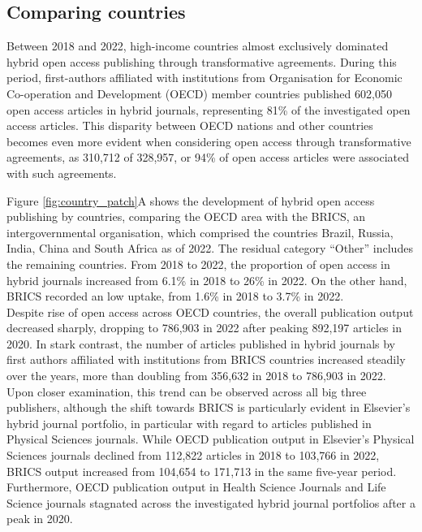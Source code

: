 \documentclass[a4paper,man,floatsintext,longtable,noextraspace,12pt]{apa6}
\begin{document}
\hypertarget{comparing-countries}{%
\subsection{Comparing countries}\label{comparing-countries}}

Between 2018 and 2022, high-income countries almost exclusively
dominated hybrid open access publishing through transformative
agreements. During this period, first-authors affiliated with
institutions from Organisation for Economic Co-operation and Development
(OECD) member countries published 602,050 open access articles in hybrid
journals, representing 81\% of the investigated open access articles.
This disparity between OECD nations and other countries becomes even
more evident when considering open access through transformative
agreements, as 310,712 of 328,957, or 94\% of open access articles were
associated with such agreements.

Figure \ref{fig:country_patch}A shows the development of hybrid open
access publishing by countries, comparing the OECD area with the BRICS,
an intergovernmental organisation, which comprised the countries Brazil,
Russia, India, China and South Africa as of 2022. The residual category
``Other'' includes the remaining countries. From 2018 to 2022, the
proportion of open access in hybrid journals increased from 6.1\% in
2018 to 26\% in 2022. On the other hand, BRICS recorded an low uptake,
from 1.6\% in 2018 to 3.7\% in 2022.\\
Despite rise of open access across OECD countries, the overall
publication output decreased sharply, dropping to 786,903 in 2022 after
peaking 892,197 articles in 2020. In stark contrast, the number of
articles published in hybrid journals by first authors affiliated with
institutions from BRICS countries increased steadily over the years,
more than doubling from 356,632 in 2018 to 786,903 in 2022. Upon closer
examination, this trend can be observed across all big three publishers,
although the shift towards BRICS is particularly evident in Elsevier's
hybrid journal portfolio, in particular with regard to articles
published in Physical Sciences journals. While OECD publication output
in Elsevier's Physical Sciences journals declined from 112,822 articles
in 2018 to 103,766 in 2022, BRICS output increased from 104,654 to
171,713 in the same five-year period. Furthermore, OECD publication
output in Health Science Journals and Life Science journals stagnated
across the investigated hybrid journal portfolios after a peak in 2020.
\end{document}
